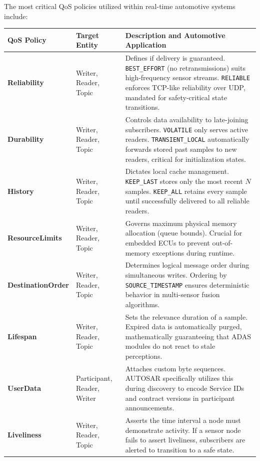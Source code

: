 The most critical QoS policies utilized within real-time automotive systems include:

\begin{table}[h!]
\centering
\renewcommand{\arraystretch}{1.3}
\begin{tabular}{|p{}|p{}|p{}|}
\hline
\textbf{QoS Policy} & \textbf{Target Entity} & \textbf{Description and Automotive Application} \\
\hline
\textbf{Reliability} & Writer, Reader, Topic & Defines if delivery is guaranteed. \texttt{BEST\_EFFORT} (no retransmissions) suits high-frequency sensor streams. \texttt{RELIABLE} enforces TCP-like reliability over UDP, mandated for safety-critical state transitions. \\
\hline
\textbf{Durability} & Writer, Reader, Topic & Controls data availability to late-joining subscribers. \texttt{VOLATILE} only serves active readers. \texttt{TRANSIENT\_LOCAL} automatically forwards stored past samples to new readers, critical for initialization states. \\
\hline
\textbf{History} & Writer, Reader, Topic & Dictates local cache management. \texttt{KEEP\_LAST} stores only the most recent $N$ samples. \texttt{KEEP\_ALL} retains every sample until successfully delivered to all reliable readers. \\
\hline
\textbf{ResourceLimits} & Writer, Reader, Topic & Governs maximum physical memory allocation (queue bounds). Crucial for embedded ECUs to prevent out-of-memory exceptions during runtime. \\
\hline
\textbf{DestinationOrder} & Writer, Reader, Topic & Determines logical message order during simultaneous writes. Ordering by \texttt{SOURCE\_TIMESTAMP} ensures deterministic behavior in multi-sensor fusion algorithms. \\
\hline
\textbf{Lifespan} & Writer, Reader, Topic & Sets the relevance duration of a sample. Expired data is automatically purged, mathematically guaranteeing that ADAS modules do not react to stale perceptions. \\
\hline
\textbf{UserData} & Participant, Reader, Writer & Attaches custom byte sequences. AUTOSAR specifically utilizes this during discovery to encode Service IDs and contract versions in participant announcements. \\
\hline
\textbf{Liveliness} & Writer, Reader, Topic & Asserts the time interval a node must demonstrate activity. If a sensor node fails to assert liveliness, subscribers are alerted to transition to a safe state. \\
\hline
\end{tabular}
\end{table}

